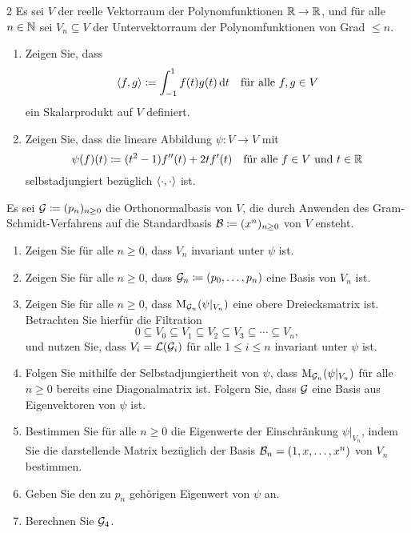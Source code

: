 \begin{question}[subtitle = Ein selbstadjungierter Endomorphismus im Unendlichdimensionalen]{2}
  Es sei $V$ der reelle Vektorraum der Polynomfunktionen $\mathbb{R} \to \mathbb{R}$, und für alle $n \in \mathbb{N}$ sei $V_n \subseteq V$ der Untervektorraum der Polynomfunktionen von Grad $\leq n$.
  \begin{enumerate}[leftmargin=*]
    \item
      Zeigen Sie, dass
      \[
                  \left\langle f, g \right\rangle
        \coloneqq \int_{-1}^1 f(t) g(t) \,\text{d}t
        \quad
        \text{für alle $f, g \in V$}
      \]
      ein Skalarprodukt auf $V$ definiert.
    \item
      Zeigen Sie, dass die lineare Abbildung $\psi \colon V \to V$ mit
      \[
        \psi(f)(t) \coloneqq (t^2 - 1) f''(t) + 2t f'(t)
        \quad
        \text{für alle $f \in V$ und $t \in \mathbb{R}$}
      \]
      selbstadjungiert bezüglich $\left\langle \cdot, \cdot \right\rangle$ ist.
  \end{enumerate}
  Es sei $\mathcal{G} \coloneqq (p_n)_{n \geq 0}$ die Orthonormalbasis von $V$, die durch Anwenden des Gram-Schmidt-Verfahrens auf die Standardbasis $\mathcal{B} \coloneqq (x^n)_{n \geq 0}$ von $V$ ensteht.
  \begin{enumerate}[resume, leftmargin=*]
    \item
      Zeigen Sie für alle $n \geq 0$, dass $V_n$ invariant unter $\psi$ ist.
    \item
      Zeigen Sie für alle $n \geq 0$, dass $\mathcal{G}_n \coloneqq (p_0, \dotsc, p_n)$ eine Basis von $V_n$ ist.
    \item
      Zeigen Sie für alle $n \geq 0$, dass $\operatorname{M}_{\mathcal{G}_n}(\psi|_{V_n})$ eine obere Dreiecksmatrix ist.
      Betrachten Sie hierfür die Filtration
      \[
        0 \subseteq V_0 \subseteq V_1 \subseteq V_2 \subseteq V_3 \subseteq \dotsb \subseteq V_n,
      \]
      und nutzen Sie, dass $V_i = \operatorname{\mathcal{L}}(\mathcal{G}_i)$ für alle $1 \leq i \leq n$ invariant unter $\psi$ ist.
    \item
      Folgen Sie mithilfe der Selbstadjungiertheit von $\psi$, dass $\operatorname{M}_{\mathcal{G}_n}(\psi|_{V_n})$ für alle $n \geq 0$ bereits eine Diagonalmatrix ist.
      Folgern Sie, dass $\mathcal{G}$ eine Basis aus Eigenvektoren von $\psi$ ist.
    \item
      Bestimmen Sie für alle $n \geq 0$ die Eigenwerte der Einschränkung $\psi|_{V_n}$, indem Sie die darstellende Matrix bezüglich der Basis $\mathcal{B}_n = (1, x, \dotsc, x^n)$ von $V_n$ bestimmen.
    \item
      Geben Sie den zu $p_n$ gehörigen Eigenwert von $\psi$ an.
    \item
      Berechnen Sie $\mathcal{G}_4$.
  \end{enumerate}
\end{question}


